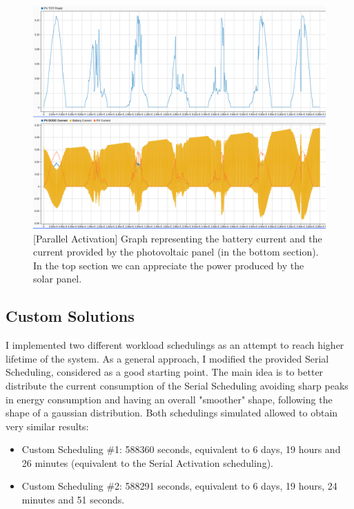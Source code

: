 \documentclass[a4paper]{article}
\begin{document}
        \begin{figure}[htp]
            \centering
            \includegraphics[width=1 \columnwidth]{./screenshots/ParActiv/2Minutes/PVTotPower-Currents.png}
            \caption{
                    \label{fig:ParPVTotPower-Currents}
                    [Parallel Activation] Graph representing the battery current and the current provided by the photovoltaic panel (in the bottom section). In the top section we can appreciate the power produced by the solar panel.
            }
        \end{figure}

    \subsection{Custom Solutions}
        I implemented two different workload schedulings as an attempt to reach higher lifetime of the system. As a general approach, I modified the provided Serial Scheduling, considered as a good starting point. The main idea is to better distribute the current consumption of the Serial Scheduling avoiding sharp peaks in energy consumption and having an overall "smoother" shape, following the shape of a gaussian distribution.
        Both schedulings simulated allowed to obtain very similar results: 
        \begin{itemize}
            \item Custom Scheduling \#1: 588360 seconds, equivalent to 6 days, 19 hours and 26 minutes (equivalent to the Serial Activation scheduling).
            \item Custom Scheduling \#2: 588291 seconds, equivalent to 6 days, 19 hours, 24 minutes and 51 seconds.
        \end{itemize}
\end{document}
